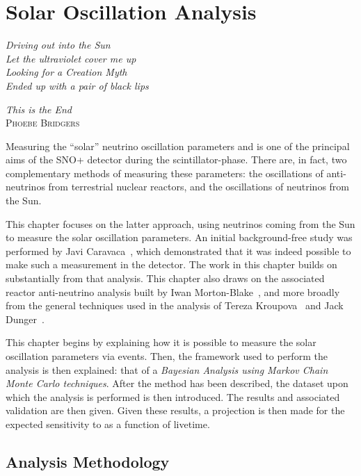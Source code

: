 \chapter{Solar Oscillation Analysis}\label{chap:solar_osc_analysis}
\epigraph{\textit{Driving out into the Sun\\Let the ultraviolet cover me up\\Looking for a Creation Myth\\Ended up with a pair of black lips}}{\textit{This is the End}\\ \textsc{Phoebe Bridgers}}
Measuring the ``solar'' neutrino oscillation parameters \dmsq{} and \tonetwo{} is one of the principal aims of the SNO+ detector during the scintillator-phase. There are, in fact, two complementary methods of measuring these parameters: the oscillations of anti-neutrinos from terrestrial nuclear reactors, and the oscillations of neutrinos from the Sun.

This chapter focuses on the latter approach, using \beight{} neutrinos coming from the Sun to measure the solar oscillation parameters. An initial background-free study was performed by Javi Caravaca~\cite{caravacaSNOSensitivityStandard2020}, %
which demonstrated that it was indeed possible to make such a measurement in the detector. The work in this chapter builds on substantially from that analysis. This chapter also draws on the associated reactor anti-neutrino analysis built by Iwan Morton-Blake~\cite{morton-blakeFirstMeasurementReactor2021}, %
and more broadly from the general techniques used in the \onbb{} analysis of Tereza Kroupova~\cite{kroupovaImprovingSensitivityNeutrinoless2020} and Jack Dunger~\cite{dungerTopologicalTimeBased2018}.%

This chapter begins by explaining how it is possible to measure the solar oscillation parameters via \beight{} events. Then, the framework used to perform the analysis is then explained: that of a \textit{Bayesian Analysis using Markov Chain Monte Carlo techniques}. After the method has been described, the dataset upon which the analysis is performed is then introduced. The results and associated validation are then given. Given these results, a projection is then made for the expected sensitivity to \tonetwo{} as a function of livetime.


\section{Analysis Methodology}\label{sec:analysis_method}
